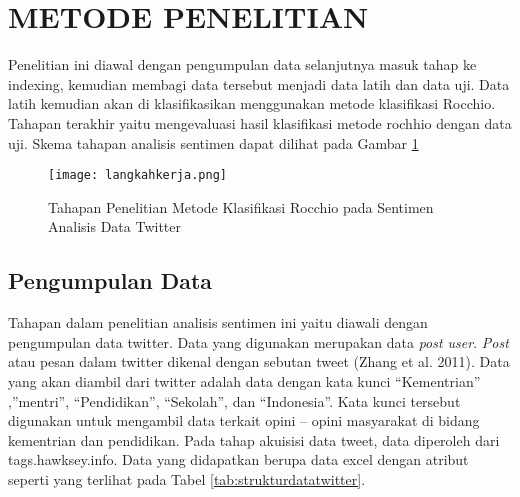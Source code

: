 
\section*{METODE PENELITIAN}

Penelitian ini diawal dengan pengumpulan data selanjutnya masuk tahap ke indexing, kemudian membagi data tersebut menjadi data latih dan data uji. Data latih kemudian akan di klasifikasikan menggunakan metode klasifikasi Rocchio. Tahapan terakhir yaitu mengevaluasi hasil klasifikasi metode rochhio dengan data uji. Skema tahapan analisis sentimen dapat dilihat pada Gambar \ref{fig:tahapan} 

\begin{figure}[h!] %
	\centering
	\texttt{[image: langkahkerja.png]}
	\caption{Tahapan Penelitian Metode Klasifikasi Rocchio pada Sentimen Analisis Data Twitter}
	\label{fig:tahapan}
\end{figure}

\subsection*{Pengumpulan Data}
Tahapan dalam penelitian analisis sentimen ini yaitu diawali dengan pengumpulan data twitter. Data yang digunakan merupakan data \textit{post user}. \textit{Post} atau pesan dalam twitter dikenal dengan sebutan tweet (Zhang et al. 2011). Data yang akan diambil dari twitter adalah data dengan kata kunci “Kementrian” ,”mentri”, “Pendidikan”, “Sekolah”, dan “Indonesia”. Kata kunci tersebut digunakan  untuk mengambil data terkait opini – opini masyarakat di bidang kementrian dan pendidikan. Pada tahap akuisisi data tweet, data diperoleh dari tags.hawksey.info. Data yang didapatkan berupa data excel dengan atribut seperti yang terlihat pada Tabel \ref{tab:strukturdatatwitter}.

